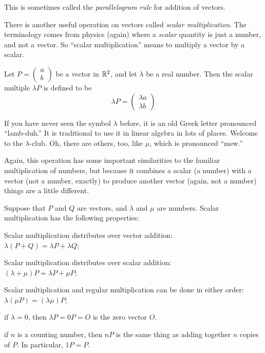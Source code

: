 \documentclass[00-livre-main.tex]{subfiles}
\begin{document}
This is sometimes called the \emph{parallelogram rule} for addition of vectors.

There is another useful operation on vectors called \emph{scalar multiplication}. 
The terminology comes from physics (again) where a \emph{scalar} quantity is just a number, and not a vector.
So ``scalar multiplication'' means to multiply a vector by a scalar.


\begin{definition}
Let $P = \left( \begin{smallmatrix} a \\ b \end{smallmatrix}\right)$ be a vector in $\mathbb{R}^2$, and let $\lambda$ be a real number. Then the scalar multiple $\lambda P$ is defined to be
\[
\lambda P = \begin{pmatrix} \lambda a \\ \lambda b \end{pmatrix}
\]
\end{definition}

If you have never seen the symbol $\lambda$ before, it is an old Greek letter pronounced ``lamb-duh.'' It is traditional to use it in linear algebra in lots of places. Welcome to the $\lambda$-club. Oh, there are others, too, like $\mu$, which is pronounced ``mew.''

Again, this operation has some important similarities to the familiar multiplication of numbers, but because it combines a scalar (a number) with a vector (not a number, exactly) to produce another vector (again, not a number) things are a little different.

\begin{theorem}
Suppose that $P$ and $Q$ are vectors, and $\lambda$ and $\mu$ are numbers. Scalar multiplication has the following properties:
\begin{compactitem}
\item Scalar multiplication distributes over vector addition:\\ $\lambda(P+Q) = \lambda P + \lambda Q$;
\item Scalar multiplication distributes over scalar addition:\\ $(\lambda + \mu)P = \lambda P + \mu P$;
\item Scalar multiplication and regular multiplication can be done in either order: $\lambda(\mu P) = (\lambda\mu) P$;
\item if $\lambda = 0$, then $\lambda P = 0 P = O$ is the zero vector $O$.
\item if $n$ is a counting number, then $nP$ is the same thing as adding together $n$ copies of $P$. In particular, $1P = P$.
\end{compactitem}
\end{theorem}
\end{document}

